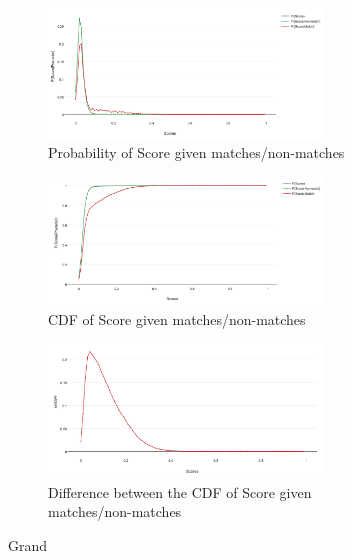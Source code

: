 \begin{figure}[htbp]
  \centering
  \begin{subfigure}[t]{\textwidth}
    \centering
    \includegraphics[width=0.8\textwidth]{dataset/grand/psm}
    \caption{Probability of Score given matches/non-matches}
    \label{fig:grand_psm} %
  \end{subfigure}%

  \begin{subfigure}[t]{\textwidth}
    \centering
    \includegraphics[width=0.8\textwidth]{dataset/grand/csm}
    \caption{CDF of Score given matches/non-matches}
    \label{fig:grand_csm} %
  \end{subfigure}%

  \begin{subfigure}[t]{\textwidth}
    \centering
    \includegraphics[width=0.8\textwidth]{dataset/grand/dsm}
    \caption{Difference between the CDF of Score given matches/non-matches}
  \end{subfigure}%
  \caption{Grand}
  \label{fig:grand_sm} %
\end{figure}

